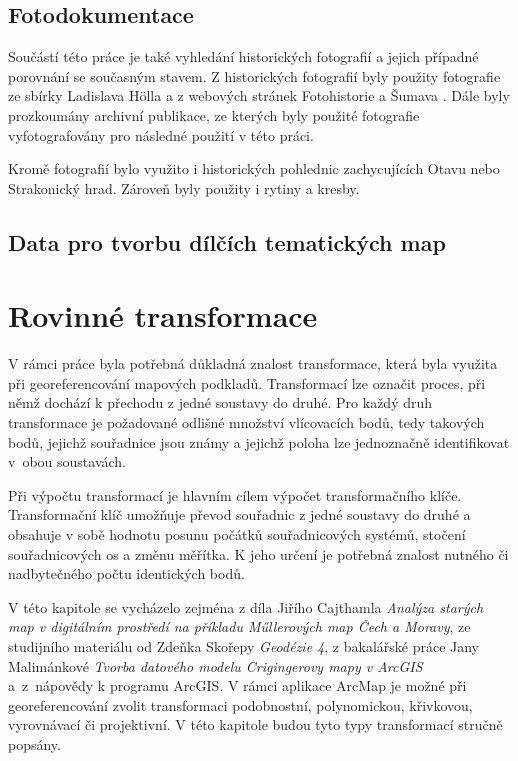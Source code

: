 \documentclass[thesis=M,czech]{FITthesis}[2012/06/26]
\begin{document}
\section{Fotodokumentace}
Součástí této práce je také vyhledání historických fotografií a jejich případné porovnání se současným stavem. Z historických fotografií byly použity fotografie ze sbírky Ladislava Hölla a z webových stránek Fotohistorie \cite{fotohistorie} a Šumava \cite{sumava}. Dále byly prozkoumány archivní publikace, ze kterých byly použité fotografie vyfotografovány pro následné použití v této práci.

Kromě fotografií bylo využito i historických pohlednic zachycujících Otavu nebo Strakonický hrad. Zároveň byly použity i rytiny a kresby.

\section{Data pro tvorbu dílčích tematických map}


\chapter{Rovinné transformace}
V rámci práce byla potřebná důkladná znalost transformace, která byla využita při georeferencování mapových podkladů. Transformací lze označit proces, při němž dochází k přechodu z jedné soustavy do druhé. Pro každý druh transformace je požadované odlišné množství vlícovacích bodů, tedy takových bodů,  jejichž souřadnice jsou známy a jejichž poloha lze jednoznačně identifikovat v~obou soustavách.

Při výpočtu transformací je hlavním cílem výpočet transformačního klíče. Transformační klíč umožňuje převod souřadnic z jedné soustavy do druhé a obsahuje v sobě hodnotu posunu počátků souřadnicových systémů, stočení souřadnicových os a změnu měřítka. K jeho určení je potřebná znalost nutného či nadbytečného počtu identických bodů. 

V této kapitole se vycházelo zejména z díla Jiřího Cajthamla \textit{Analýza starých map v digitálním prostředí na příkladu Műllerových map Čech a Moravy}, ze studijního materiálu od Zdeňka Skořepy \textit{Geodézie 4}, z bakalářské práce Jany Malimánkové \textit{Tvorba datového modelu Crigingerovy mapy v ArcGIS} a~z~nápovědy k programu ArcGIS. V rámci aplikace ArcMap je možné při georeferencování zvolit transformaci podobnostní, polynomickou, křivkovou, vyrovnávací či projektivní. V této kapitole budou tyto typy transformací stručně popsány. \cite{transformace} \cite{skorepa} \cite{gis_transformace} \cite{vugtk} \cite{malimankova}
\end{document}
